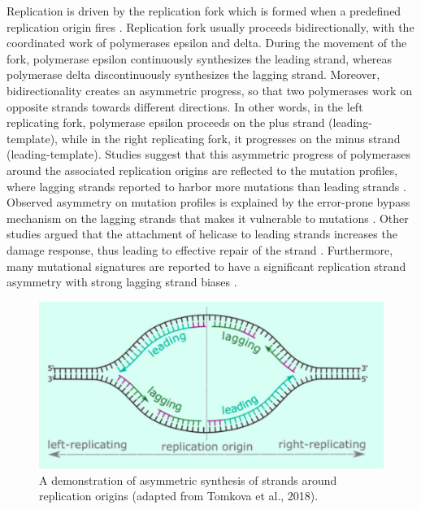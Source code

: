 Replication is driven by the replication fork which is formed when a predefined replication origin fires \citep{langston2009whither}. Replication fork usually proceeds bidirectionally, with the coordinated work of polymerases \gls{epsilon} and \gls{delta}. During the movement of the fork, polymerase \gls{epsilon} continuously synthesizes the leading strand, whereas polymerase \gls{delta} discontinuously synthesizes the lagging strand. Moreover, bidirectionality creates an asymmetric progress, so that two polymerases work on opposite strands towards different directions. In other words, in the left replicating fork, polymerase \gls{epsilon} proceeds on the plus strand (leading-template), while in the right replicating fork, it progresses on the minus strand (leading-template). Studies suggest that this asymmetric progress of polymerases around the associated replication origins are reflected to the mutation profiles, where lagging strands reported to harbor more mutations than leading strands \citep{haradhvala2016mutational,lujan2012mismatch,reijns2015lagging,shinbrot2014exonuclease}. Observed asymmetry on mutation profiles is explained by the error-prone bypass mechanism on the lagging strands that makes it vulnerable to mutations \citep{seplyarskiy2019error}. Other studies argued that the attachment of helicase to leading strands increases the damage response, thus leading to effective repair of the strand \citep{hedglin2017eukaryotic,yeeles2013rescuing}. Furthermore, many mutational signatures are reported to have a significant replication strand asymmetry with strong lagging strand biases \citep{tomkova2018mutational}.

\begin{figure}[H]
    \begin{center}
    \includegraphics[width=\textwidth]{Chapters/1_introduction/figures/repfork}
    \caption{A demonstration of asymmetric synthesis of strands around replication origins (adapted from Tomkova et al., 2018).}
    \label{fig:introrepfork}
    \end{center}
    \end{figure}

